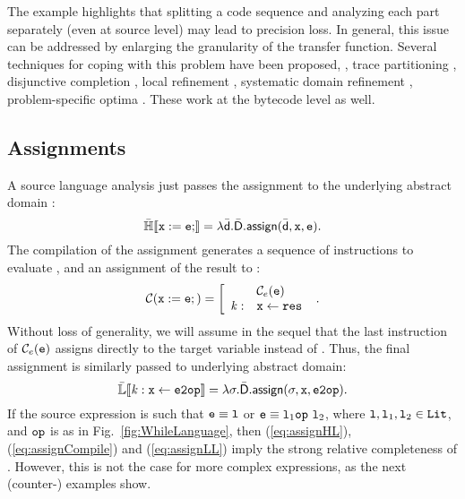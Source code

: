 \documentclass{llncs}
\begin{document}
{The example highlights that splitting a code sequence and analyzing
each part separately (even at source level) may lead to precision loss.  In
general, this issue can be addressed by enlarging the granularity of
the transfer function. Several techniques for coping with this problem
have been proposed, \eg, trace partitioning \cite{Tzolovski98},
disjunctive completion \cite{CousotCousot92-1}, local refinement
\cite{ColbyLee96}, systematic domain refinement \cite{Giacobazzi00},
problem-specific optima \cite{Monniaux07}. These work at the bytecode
level as well.
}

\subsection{Assignments}
\label{sec:assignment}
A source language analysis just passes the assignment to the underlying abstract domain : 
\begin{equation}
\mathbb{\bar{H}}\llbracket \mathtt{\mathtt{x}:= \mathtt{e};} \rrbracket = \lambda \bar{\mathsf{d}}. \bar{\mathsf{D}}.\mathsf{\mathsf{assign}}(\bar{\mathsf{d}}, \mathtt{x}, \mathtt{e}).
\label{eq:assignHL}
\end{equation}
The compilation of the assignment generates a sequence of instructions
to evaluate , and an assignment of the result to : 
\begin{equation}
\mathcal{C}(\mathtt{x}:= \mathtt{e};) = \left [ \begin{array}{ll}& \mathcal{C}_{e}(\mathtt{e}) \\ \mathit{k} :& \mathtt{x} \leftarrow \mathtt{res}\end{array} \right. \ .
\label{eq:assignCompile}
\end{equation}
Without loss of generality, we will assume in the sequel that the last
instruction of $\mathcal{C}_{e}(\mathtt{e})$ assigns directly to the target
variable  instead of .
Thus, the final assignment is similarly passed to underlying abstract domain:
\begin{equation}
\mathbb{\bar{L}}\llbracket \mathtt{\mathit{k}: \mathtt{x} \leftarrow \mathtt{e2op}} \rrbracket = \lambda \sigma. \bar{\mathsf{D}}.\mathsf{\mathsf{assign}}(\sigma, \mathtt{x}, \mathtt{e2op}).
\label{eq:assignLL}
\end{equation}
If the source expression  is such that $\mathtt{e} \equiv \mathtt{l}$ or $\mathtt{e} \equiv \mathtt{l}_1 \mathtt{op}\ \mathtt{l}_2$, where $\mathtt{l}, \mathtt{l}_1, \mathtt{l}_2 \in \mathtt{Lit}$, and $\mathtt{op}$ is as in Fig.~\ref{fig:WhileLanguage}, then (\ref{eq:assignHL}), (\ref{eq:assignCompile}) and (\ref{eq:assignLL}) imply the strong relative completeness of .
However, this is not the case for more complex expressions, as the next ({counter-}) examples show.
\end{document}
